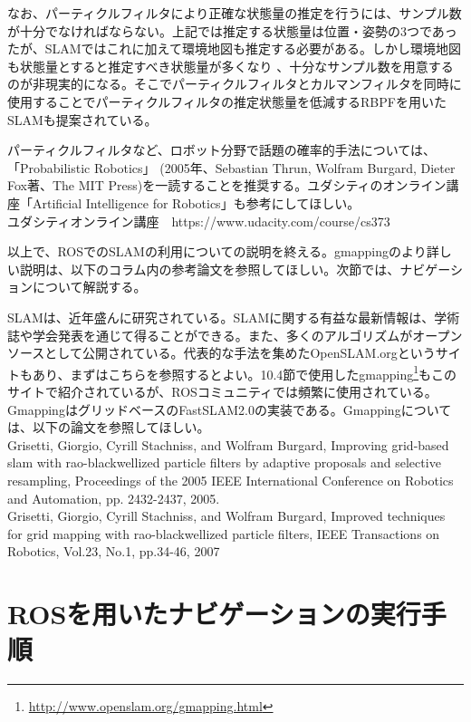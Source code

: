 なお、パーティクルフィルタにより正確な状態量の推定を行うには、サンプル数が十分でなければならない。上記では推定する状態量は位置・姿勢の3つであったが、SLAMではこれに加えて環境地図も推定する必要がある。しかし環境地図も状態量とすると推定すべき状態量が多くなり  、十分なサンプル数を用意するのが非現実的になる。そこでパーティクルフィルタとカルマンフィルタを同時に使用することでパーティクルフィルタの推定状態量を低減するRBPFを用いたSLAMも提案されている。

\begin{exercise}[パーティクルフィルタの解説書]
  パーティクルフィルタなど、ロボット分野で話題の確率的手法については、「Probabilistic Robotics」   (2005年、Sebastian Thrun, Wolfram Burgard, Dieter Fox著、The MIT Press)を一読することを推奨する。ユダシティのオンライン講座「Artificial Intelligence for Robotics」も参考にしてほしい。\\
  ユダシティオンライン講座　https://www.udacity.com/course/cs373
\end{exercise}

以上で、ROSでのSLAMの利用についての説明を終える。gmappingのより詳しい説明は、以下のコラム内の参考論文を参照してほしい。次節では、ナビゲーションについて解説する。

\begin{exercise}[OpenSLAMとGmapping]
  SLAMは、近年盛んに研究されている。SLAMに関する有益な最新情報は、学術誌や学会発表を通じて得ることができる。また、多くのアルゴリズムがオープンソースとして公開されている。代表的な手法を集めたOpenSLAM.orgというサイトもあり、まずはこちらを参照するとよい。10.4節で使用したgmapping\footnote{\url{http://www.openslam.org/gmapping.html}}もこのサイトで紹介されているが、ROSコミュニティでは頻繁に使用されている。GmappingはグリッドベースのFastSLAM2.0の実装である。Gmappingについては、以下の論文を参照してほしい。\\
  Grisetti, Giorgio, Cyrill Stachniss, and Wolfram Burgard, Improving grid-based slam with rao-blackwellized particle filters by adaptive proposals and selective resampling, Proceedings of the 2005 IEEE International Conference on Robotics and Automation, pp. 2432-2437, 2005.\\
  Grisetti, Giorgio, Cyrill Stachniss, and Wolfram Burgard, Improved techniques for grid mapping with rao-blackwellized particle filters, IEEE Transactions on Robotics, Vol.23, No.1, pp.34-46, 2007
\end{exercise}

\section{ROSを用いたナビゲーションの実行手順}


